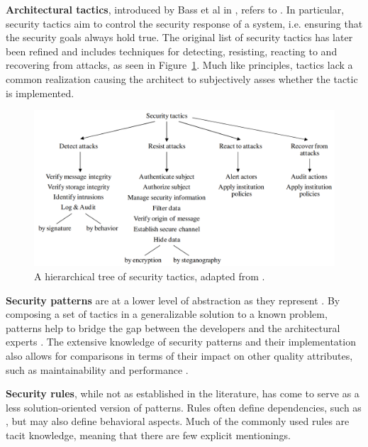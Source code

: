 \textbf{Architectural tactics}, introduced by Bass et al in \cite{bass_software_2003}, refers to . In particular, security tactics aim to control the security response of a system, i.e. ensuring that the security goals always hold true. The original list of security tactics has later been refined \cite{ryoo_revising_2012,fernandez_revisiting_2015} and includes techniques for detecting, resisting, reacting to and recovering from attacks, as seen in Figure~\ref{fig:security_tactics}. Much like principles, tactics lack a common realization causing the architect to subjectively asses whether the tactic is implemented.

\begin{figure}
    \centering
    \captionsetup{justification=centering}
    \includegraphics[width=\textwidth]{figure/securityTactics.png}
    \caption{A hierarchical tree of security tactics, adapted from \cite{fernandez_revisiting_2015}.}
    \label{fig:security_tactics}
\end{figure}

\textbf{Security patterns} are at a lower level of abstraction as they represent  \cite{fernandez-buglioni_security_2013}. By composing a set of tactics in a generalizable solution to a known problem, patterns help to bridge the gap between the developers and the architectural experts \cite{rosado_study_2006}. The extensive knowledge of security patterns and their implementation also allows for comparisons in terms of their impact on other quality attributes, such as maintainability and performance \cite{scandariato_architecting_2009}. 

\textbf{Security rules}, while not as established in the literature, has come to serve as a less solution-oriented version of patterns. Rules often define dependencies, such as , but may also define behavioral aspects. Much of the commonly used rules are tacit knowledge, meaning that there are few explicit mentionings. 

